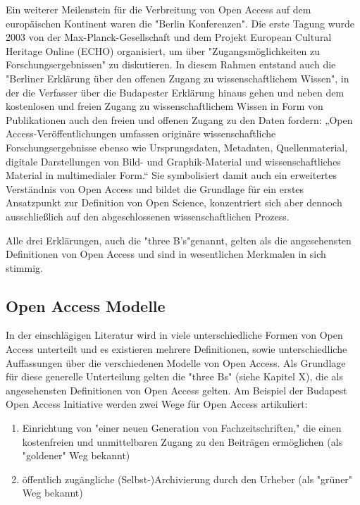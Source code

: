 Ein weiterer Meilenstein für die Verbreitung von Open Access auf dem europäischen Kontinent waren die "Berlin Konferenzen"\cite{CREATe_2014}. Die erste Tagung wurde 2003 von der Max-Planck-Gesellschaft und dem Projekt European Cultural Heritage Online (ECHO) organisiert, um über "Zugangsmöglichkeiten zu Forschungsergebnissen" zu diskutieren. In diesem Rahmen entstand auch die "Berliner Erklärung über den offenen Zugang zu wissenschaftlichem Wissen"\cite{berliner_erklaerung_2003}, in der die Verfasser über die Budapester Erklärung hinaus gehen und neben dem kostenlosen und freien Zugang zu wissenschaftlichem Wissen in Form von Publikationen auch den freien und offenen Zugang zu den Daten fordern: „Open Access-Veröffentlichungen umfassen originäre wissenschaftliche Forschungsergebnisse ebenso wie Ursprungsdaten, Metadaten, Quellenmaterial, digitale Darstellungen von Bild- und Graphik-Material und wissenschaftliches Material in multimedialer Form.“\cite{berliner_erklaerung_2003} Sie symbolisiert damit auch ein erweitertes Verständnis von Open Access und bildet die Grundlage für ein erstes Ansatzpunkt zur Definition von Open Science, konzentriert sich aber dennoch ausschließlich auf den abgeschlossenen wissenschaftlichen Prozess\cite{suchen}.

Alle drei Erklärungen, auch die "three B's"\cite{suber_2004_praising_oa}genannt, gelten als die angesehensten Definitionen von Open Access und sind in wesentlichen Merkmalen in sich stimmig\cite{albert_2006_open_implications}.

\subsection{Open Access Modelle}

In der einschlägigen Literatur wird in viele unterschiedliche Formen von Open Access unterteilt und es existieren mehrere Definitionen\cite{CREATe_2014}\cite{albert_2006_open_implications}, sowie unterschiedliche Auffassungen über die verschiedenen Modelle von Open Access\cite{CREATe_2014}\cite{cite:22b}\cite{lewis_2012_inevitability}. Als Grundlage für diese generelle Unterteilung gelten die "three Bs" (siehe Kapitel X), die als angesehensten Definitionen von Open Access gelten. Am Beispiel der Budapest Open Access Initiative werden zwei Wege für Open Access artikuliert\cite{albert_2006_open_implications}: 
\begin{enumerate}
\item Einrichtung von "einer neuen Generation von Fachzeitschriften," die einen kostenfreien und unmittelbaren Zugang zu den Beiträgen ermöglichen (als "goldener" Weg bekannt)
\item öffentlich zugängliche (Selbst-)Archivierung durch den Urheber (als "grüner" Weg bekannt)
\end{enumerate}

